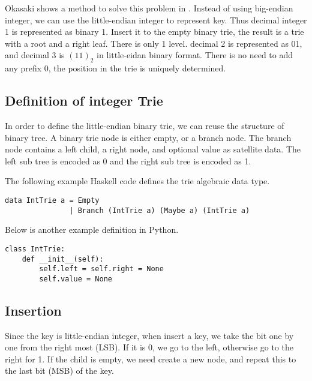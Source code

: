 \documentclass{article}
\begin{document}
Okasaki shows a method to solve this problem in \cite{okasaki-int-map}. Instead of
using big-endian integer, we can use the little-endian integer to represent key.
Thus decimal integer 1 is represented as binary 1. Insert it to the empty binary
trie, the result is a trie with a root and a right leaf.
There is only 1 level. decimal 2 is represented as 01, and decimal 3 is $(11)_2$
in little-eidan binary format. There is no need to add
any prefix 0, the position in the trie is uniquely determined.

\subsection{Definition of integer Trie}
In order to define the little-endian binary trie, we can reuse the structure
of binary tree.
A binary trie node is either empty, or a branch node. The branch
node contains a left child, a right node, and optional value as
satellite data.
The left sub tree is encoded as 0 and the right sub tree
is encoded as 1.

The following example Haskell code defines the trie algebraic data type.

\lstset{language=Haskell}
\begin{lstlisting}
data IntTrie a = Empty
               | Branch (IntTrie a) (Maybe a) (IntTrie a)
\end{lstlisting}

Below is another example definition in Python.

\lstset{language=Python}
\begin{lstlisting}
class IntTrie:
    def __init__(self):
        self.left = self.right = None
        self.value = None
\end{lstlisting}


\subsection{Insertion}

Since the key is little-endian integer, when insert a key, we take the
bit one by one from the right most (LSB).
If it is 0, we go to the left, otherwise go to the right
for 1. If the child is empty, we need create a new node, and repeat this to
the last bit (MSB) of the key.
\end{document}
